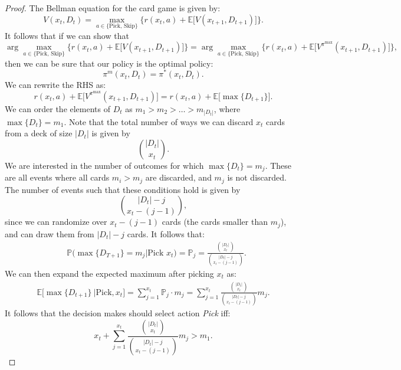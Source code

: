 \documentclass{article}
\begin{document}
\begin{proof}
    The Bellman equation for the card game is given by:
    \begin{equation}
        V(x_t, D_t) =  \max_{a \in \{\text{Pick, Skip}\}}\Big\{r(x_t,a) + \mathbb{E}\Big[V(x_{t+1}, D_{t+1})\Big]\Big\}.
    \end{equation}
    It follows that if we can show that
    \begin{equation}
        \arg \max_{a \in \{\text{Pick, Skip}\}}\Big\{r(x_t,a) + \mathbb{E}\Big[V(x_{t+1}, D_{t+1})\Big]\Big\} = \arg \max_{a \in \{\text{Pick, Skip}\}}\Big\{r(x_t,a) + \mathbb{E}\Big[V^{\pi^{\max}}(x_{t+1}, D_{t+1})\Big]\Big\},
    \end{equation}
    then  we can be sure that our policy is the optimal policy:
    \begin{equation}
        \pi^m(x_t, D_t) = \pi^*(x_t, D_t).
    \end{equation}
    We can rewrite the RHS as:
    \begin{equation}
        r(x_t,a) + \mathbb{E}\Big[V^{\pi^{\max}}(x_{t+1}, D_{t+1})\Big] = r(x_t,a) + \mathbb{E}\big[\max\{D_{t+1}\}\big].
    \end{equation}
    We can order the elements of $D_t$ as $m_1 > m_2 > \dots > m_{|D_t|}$, where $\max\{D_t\} = m_1$.
    Note that the total number of ways we can discard $x_t$ cards from a deck of size $|D_t|$ is given by
    \begin{equation}
        \binom{|D_t|}{x_t}.
    \end{equation}
    We are interested in the number of outcomes for which $\max\{D_t\}=m_j$. These are all events where all cards $m_i>m_j$ are discarded, and $m_j$ is not discarded. The number of events such that these conditions hold is given by
    \begin{equation}
        \binom{|D_t|-j}{x_t-(j-1)},
    \end{equation}
    since we can randomize over $x_t-(j-1)$ cards (the cards smaller than $m_j$), and can draw them from $|D_t|-j$ cards. It follows that:
    \begin{align}
         & \mathbb{P}\Big(\max\{D_{T+1}\}  = m_j \big| \text{Pick } x_t\Big) = \mathbb{P}_j  = \frac{\binom{|D_t|}{x_t}}{\binom{|D_t|-j}{x_t-(j-1)}} .
    \end{align}
    We can then expand the expected maximum after picking $x_t$ as:
    \begin{align}
        \mathbb{E}\big[\max\{D_{t+1}\} \ | \text{Pick}, x_t\big] = \sum^{x_t}_{j=1} \mathbb{P}_j\cdot m_j = \sum^{x_t}_{j=1} \frac{\binom{|D_t|}{x_t}}{\binom{|D_t|-j}{x_t-(j-1)}}  m_j.
    \end{align}
    It follows that the decision makes should select action \textit{Pick} iff:
    \begin{equation}
        x_t+ \sum^{x_t}_{j=1} \frac{\binom{|D_t|}{x_t}}{\binom{|D_t|-j}{x_t-(j-1)}}  m_j > m_1.
    \end{equation}





\end{proof}
\end{document}
